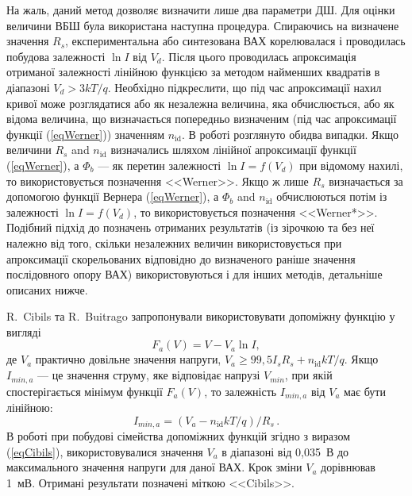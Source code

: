 На жаль, даний метод дозволяє визначити лише два параметри ДШ.
Для оцінки величини ВБШ була використана наступна процедура.
Спираючись на визначене значення $R_s$, експериментальна або синтезована ВАХ корелювалася і проводилась побудова залежності  $\ln I$ від $V_d$.
Після цього проводилась апроксимація отриманої залежності лінійною функцією за методом найменших квадратів \cite[с.~67]{KalitkinBook} в діапазоні $V_d>3kT/q$.
Необхідно підкреслити, що під час апроксимації нахил кривої може розглядатися або як незалежна величина, яка обчислюється, або як відома величина, що визначається попередньо визначеним (під час апроксимації функції (\ref{eqWerner})) значенням $n_\mathrm{id}$.
В роботі розглянуто обидва випадки.
Якщо величини $R_s$ and $n_\mathrm{id}$ визначались шляхом лінійної апроксимації функції (\ref{eqWerner}), а $\Phi_b$ --- як перетин залежності $\ln I=f(V_d)$ при відомому нахилі, то використовується позначення <<Werner>>.
Якщо ж лише $R_s$ визначається за допомогою функції Вернера (\ref{eqWerner}), а $\Phi_b$ and $n_\mathrm{id}$ обчислюються потім із залежності $\ln I=f(V_d)$, то використовується позначення <<Werner*>>.
Подібний підхід до позначень отриманих результатів (із зірочкою та без неї належно від того, скільки незалежних величин використовується при апроксимації скорельованих відповідно до визначеного раніше значення послідовного опору ВАХ) використовуються і для інших методів, детальніше описаних нижче.

R.~Cibils  та R.~Buitrago \cite{Cibils} запропонували використовувати допоміжну функцію у вигляді
\begin{equation}
\label{eqCibils}
F_a(V)=V-V_a\ln I,
\end{equation}
де
$V_a$ практично довільне значення напруги, $V_a\geq99,5I_sR_s+n_\mathrm{id}kT/q$.
Якщо $I_{min,a}$ --- це значення струму, яке відповідає напрузі $V_{min}$, при якій спостерігається мінімум функції $F_a(V)$,
то залежність $I_{min,a}$ від $V_a$ має бути \cite{Cibils} лінійною:
\begin{equation}
\label{eqCibilsDet}
I_{min,a}=(V_a-n_\mathrm{id}kT/q)/R_s\,.
\end{equation}
В роботі при побудові сімейства допоміжних функцій згідно з виразом (\ref{eqCibils}), використовувалися значення  $V_a$ в діапазоні від 0,035~В до максимального значення напруги для даної ВАХ.
Крок зміни $V_a$ дорівнював 1~мВ.
Отримані результати позначені міткою <<Cibils>>.

